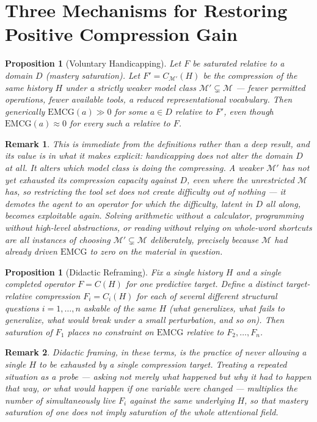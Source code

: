 \documentclass[11pt]{article}
\newtheorem{proposition}[definition]{Proposition}
\newtheorem*{remark}{Remark}
\begin{document}
\section{Three Mechanisms for Restoring Positive Compression Gain}

\begin{proposition}[Voluntary Handicapping]
Let $F$ be saturated relative to a domain $D$ (mastery saturation). Let $F'=C_{\mathcal{M}'}(H)$ be the compression of the same history $H$ under a strictly weaker model class $\mathcal{M}'\subsetneq\mathcal{M}$ — fewer permitted operations, fewer available tools, a reduced representational vocabulary. Then generically $\mathrm{EMCG}(a) \gg 0$ for some $a\in D$ relative to $F'$, even though $\mathrm{EMCG}(a)\approx0$ for every such $a$ relative to $F$.
\end{proposition}

\begin{remark}
This is immediate from the definitions rather than a deep result, and its value is in what it makes explicit: handicapping does not alter the domain $D$ at all. It alters which model class is doing the compressing. A weaker $\mathcal{M}'$ has not yet exhausted its compression capacity against $D$, even where the unrestricted $\mathcal{M}$ has, so restricting the tool set does not create difficulty out of nothing — it demotes the agent to an operator for which the difficulty, latent in $D$ all along, becomes exploitable again. Solving arithmetic without a calculator, programming without high-level abstractions, or reading without relying on whole-word shortcuts are all instances of choosing $\mathcal{M}'\subsetneq\mathcal{M}$ deliberately, precisely because $\mathcal{M}$ had already driven $\mathrm{EMCG}$ to zero on the material in question.
\end{remark}

\begin{proposition}[Didactic Reframing]
Fix a single history $H$ and a single completed operator $F=C(H)$ for one predictive target. Define a distinct target-relative compression $F_i = C_i(H)$ for each of several different structural questions $i=1,\dots,n$ askable of the same $H$ (what generalizes, what fails to generalize, what would break under a small perturbation, and so on). Then saturation of $F_1$ places no constraint on $\mathrm{EMCG}$ relative to $F_2,\dots,F_n$.
\end{proposition}

\begin{remark}
Didactic framing, in these terms, is the practice of never allowing a single $H$ to be exhausted by a single compression target. Treating a repeated situation as a probe — asking not merely what happened but why it had to happen that way, or what would happen if one variable were changed — multiplies the number of simultaneously live $F_i$ against the same underlying $H$, so that mastery saturation of one does not imply saturation of the whole attentional field.
\end{remark}
\end{document}
